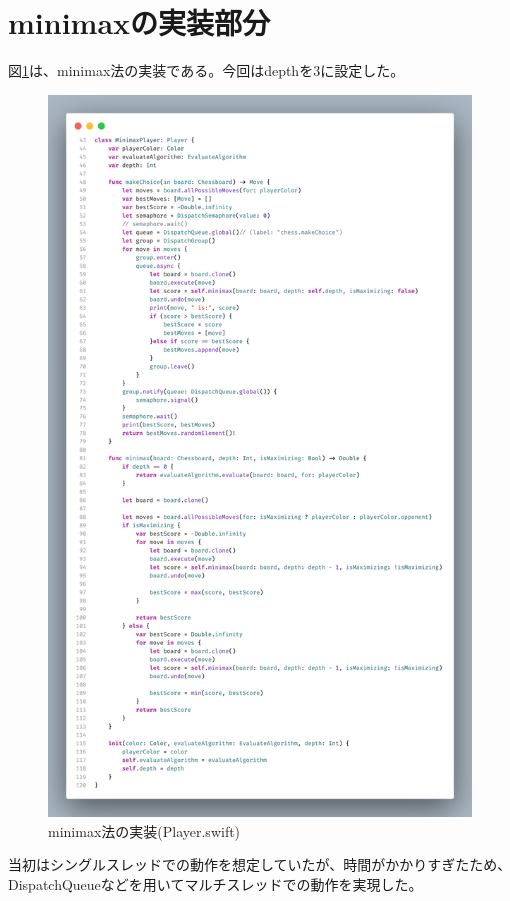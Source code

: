 \documentclass[12pt, a4paper, uplatex]{jsarticle}
\begin{document}
\section{minimaxの実装部分}
図\ref{fig:minimax}は、minimax法の実装である。今回はdepthを3に設定した。
\begin{figure}
  [h]
  \centering
  \includegraphics[height=0.6\textheight]{minimax.png}
  \caption{minimax法の実装(Player.swift)}\label{fig:minimax}
\end{figure}
当初はシングルスレッドでの動作を想定していたが、時間がかかりすぎたため、
DispatchQueueなどを用いてマルチスレッドでの動作を実現した。
\end{document}
